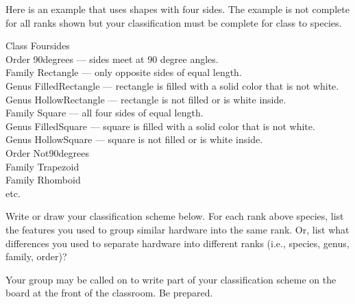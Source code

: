 \documentclass[12pt]{exam}
\newlength{\myindent}
\newcommand{\ind}{\hspace*{\myindent}}
\begin{document}
\bigskip

Here is an example that uses shapes with four sides. 
The example is not complete for all ranks shown but your classification 
must be complete for class to species.

Class Foursides	\\
\ind Order 90degrees — sides meet at 90 degree angles.\\
\ind	\ind Family Rectangle — only opposite sides of equal length.\\
\ind	\ind	\ind Genus FilledRectangle — rectangle is filled with a solid color that is not white.\\
\ind	\ind	\ind Genus HollowRectangle  — rectangle is not filled or is white inside. \\
\ind	\ind Family Square — all four sides of equal length.\\
\ind	\ind	\ind Genus FilledSquare — square is filled with a solid color that is not white.\\ 
\ind	\ind	\ind Genus HollowSquare — square is not filled or is white inside. \\
\ind Order Not90degrees\\
\ind	\ind Family Trapezoid\\
\ind	\ind Family Rhomboid \\
\ind	\ind	\ind etc.



\begin{questions}

\question
Write or draw your classification scheme below. For each rank above species, list the
features you used to group similar hardware into the same rank. Or, list what differences
you used to separate hardware into different ranks (i.e., species, genus, family, order)?

Your group may be called on to write part of your classification scheme on the board at 
the front of the classroom. Be prepared.

\end{questions}


	
	
	
%	
\end{document}
